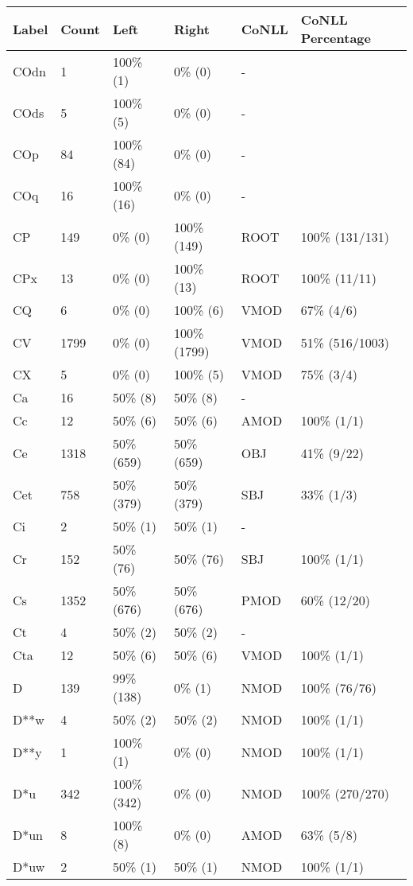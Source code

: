 \begin{figure*}
\begin{tabular}{|l|l|l|l||l|l|}
\hline
Label & Count & Left & Right & CoNLL & CoNLL Percentage\\ 
\hline
 COdn & 1 & 100\% (1) & 0\% (0) & - &  \\ 
\hline
 COds & 5 & 100\% (5) & 0\% (0) & - &  \\ 
\hline
 COp & 84 & 100\% (84) & 0\% (0) & - &  \\ 
\hline
 COq & 16 & 100\% (16) & 0\% (0) & - &  \\ 
\hline
 CP & 149 & 0\% (0) & 100\% (149) & ROOT & 100\% (131/131) \\ 
\hline
 CPx & 13 & 0\% (0) & 100\% (13) & ROOT & 100\% (11/11) \\ 
\hline
 CQ & 6 & 0\% (0) & 100\% (6) & VMOD & 67\% (4/6) \\ 
\hline
 CV & 1799 & 0\% (0) & 100\% (1799) & VMOD & 51\% (516/1003) \\ 
\hline
 CX & 5 & 0\% (0) & 100\% (5) & VMOD & 75\% (3/4) \\ 
\hline
 Ca & 16 & 50\% (8) & 50\% (8) & - &  \\ 
\hline
 Cc & 12 & 50\% (6) & 50\% (6) & AMOD & 100\% (1/1) \\ 
\hline
 Ce & 1318 & 50\% (659) & 50\% (659) & OBJ & 41\% (9/22) \\ 
\hline
 Cet & 758 & 50\% (379) & 50\% (379) & SBJ & 33\% (1/3) \\ 
\hline
 Ci & 2 & 50\% (1) & 50\% (1) & - &  \\ 
\hline
 Cr & 152 & 50\% (76) & 50\% (76) & SBJ & 100\% (1/1) \\ 
\hline
 Cs & 1352 & 50\% (676) & 50\% (676) & PMOD & 60\% (12/20) \\ 
\hline
 Ct & 4 & 50\% (2) & 50\% (2) & - &  \\ 
\hline
 Cta & 12 & 50\% (6) & 50\% (6) & VMOD & 100\% (1/1) \\ 
\hline
 D & 139 & 99\% (138) & 0\% (1) & NMOD & 100\% (76/76) \\ 
\hline
 D**w & 4 & 50\% (2) & 50\% (2) & NMOD & 100\% (1/1) \\ 
\hline
 D**y & 1 & 100\% (1) & 0\% (0) & NMOD & 100\% (1/1) \\ 
\hline
 D*u & 342 & 100\% (342) & 0\% (0) & NMOD & 100\% (270/270) \\ 
\hline
 D*un & 8 & 100\% (8) & 0\% (0) & AMOD & 63\% (5/8) \\ 
\hline
 D*uw & 2 & 50\% (1) & 50\% (1) & NMOD & 100\% (1/1) \\ 

\end{tabular}
\end{figure*}

